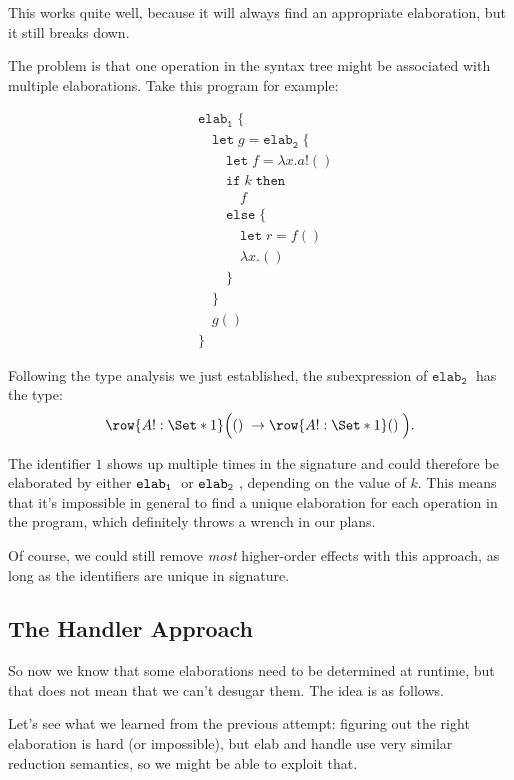 \documentclass{article}
\newcommand\kw[1]{\mathbf{\mathtt{#1}}\;}
\newcommand\unit{\kw{()}}
\newcommand\val{\kw{let}}
\newcommand\elab[2][]{\kw{elab_{#1}}#2}
\renewcommand\S{\Set*}
\begin{document}
This works quite well, because it will always find an appropriate elaboration, but it still breaks down.

The problem is that one operation in the syntax tree might be associated with multiple elaborations. Take this program for example:

\begin{align*}
    &\elab[1]{\{\\
    &\quad\val g = \elab[2]{\{\\
    &\quad\quad\val f = \lambda x. a!()\\
    &\quad\quad\kw{if} k\;\kw{then}\\
    &\quad\quad\quad f\\
    &\quad\quad\kw{else}\{\\
    &\quad\quad\quad\val r = f()\\
    &\quad\quad\quad\lambda x. ()\\
    &\quad\quad\}\\
    &\quad\}}\\
    &\quad g()\\
    &\}}
\end{align*}

Following the type analysis we just established, the subexpression of $\elab[2]{}$ has the type:
\[
    \row{A!: \S{1}} \Big(\unit \to \row{A!: \S{1}} \unit\Big).
\]

The identifier $1$ shows up multiple times in the signature and could therefore be elaborated by either $\elab[1]$ or $\elab[2]$, depending on the value of $k$. This means that it's impossible in general to find a unique elaboration for each operation in the program, which definitely throws a wrench in our plans.

Of course, we could still remove \emph{most} higher-order effects with this approach, as long as the identifiers are unique in signature.

\subsection{The Handler Approach}

So now we know that some elaborations need to be determined at runtime, but that does not mean that we can't desugar them. The idea is as follows.

Let's see what we learned from the previous attempt: figuring out the right elaboration is hard (or impossible), but elab and handle use very similar reduction semantics, so we might be able to exploit that.
\end{document}
